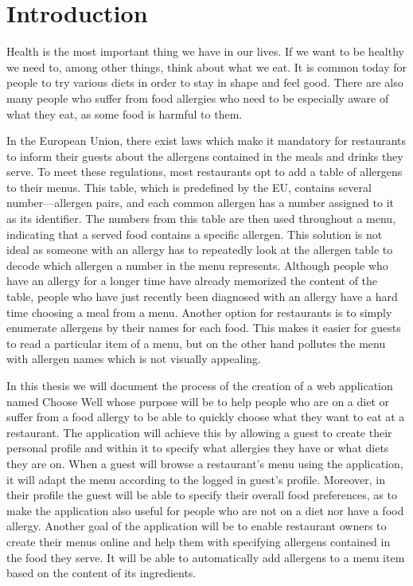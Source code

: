 \chapter*{Introduction}

\noindent Health is the most important thing we have in our lives.
If we want to be healthy we need to, among other things, think about what we eat.
It is common today for people to try various diets in order to stay in shape and feel good.
There are also many people who suffer from food allergies who need to be especially aware of what they eat, as some food is harmful to them.

In the European Union, there exist laws which make it mandatory for restaurants to inform their guests about the allergens contained in the meals and drinks they serve.
To meet these regulations, most restaurants opt to add a table of allergens to their menus.
This table, which is predefined by the EU, contains several number---allergen pairs, and each common allergen has a number assigned to it as its identifier.
The numbers from this table are then used throughout a menu, indicating that a served food contains a specific allergen.
This solution is not ideal as someone with an allergy has to repeatedly look at the allergen table to decode which allergen a number in the menu represents.
Although people who have an allergy for a longer time have already memorized the content of the table, people who have just recently been diagnosed with an allergy have a hard time choosing a meal from a menu.
Another option for restaurants is to simply enumerate allergens by their names for each food.
This makes it easier for guests to read a particular item of a menu, but on the other hand pollutes the menu with allergen names which is not visually appealing.

In this thesis we will document the process of the creation of a web application named Choose Well whose purpose will be to help people who are on a diet or suffer from a food allergy to be able to quickly choose what they want to eat at a restaurant.
The application will achieve this by allowing a guest to create their personal profile and within it to specify what allergies they have or what diets they are on. 
When a guest will browse a restaurant's menu using the application, it will adapt the menu according to the logged in guest's profile.
Moreover, in their profile the guest will be able to specify their overall food preferences, as to make the application also useful for people who are not on a diet nor have a food allergy.
Another goal of the application will be to enable restaurant owners to create their menus online and help them with specifying allergens contained in the food they serve.
It will be able to automatically add allergens to a menu item based on the content of its ingredients.

